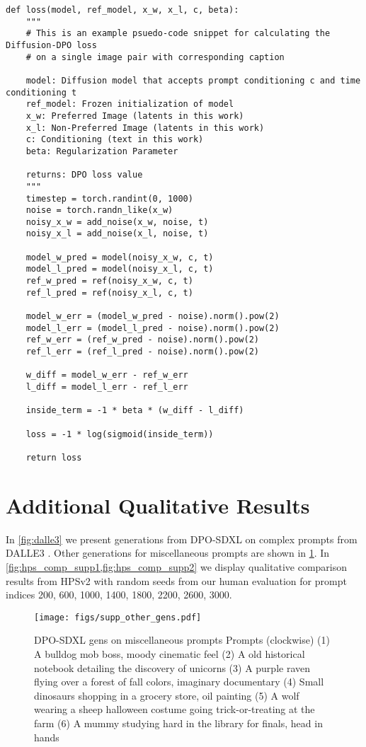 \documentclass[10pt,twocolumn,letterpaper]{article}
\begin{document}
\begin{verbatim}
def loss(model, ref_model, x_w, x_l, c, beta):
    """
    # This is an example psuedo-code snippet for calculating the Diffusion-DPO loss
    # on a single image pair with corresponding caption
    
    model: Diffusion model that accepts prompt conditioning c and time conditioning t
    ref_model: Frozen initialization of model
    x_w: Preferred Image (latents in this work)
    x_l: Non-Preferred Image (latents in this work)
    c: Conditioning (text in this work)
    beta: Regularization Parameter

    returns: DPO loss value
    """
    timestep = torch.randint(0, 1000)
    noise = torch.randn_like(x_w)
    noisy_x_w = add_noise(x_w, noise, t)
    noisy_x_l = add_noise(x_l, noise, t)

    model_w_pred = model(noisy_x_w, c, t)
    model_l_pred = model(noisy_x_l, c, t)
    ref_w_pred = ref(noisy_x_w, c, t)
    ref_l_pred = ref(noisy_x_l, c, t)

    model_w_err = (model_w_pred - noise).norm().pow(2)
    model_l_err = (model_l_pred - noise).norm().pow(2)
    ref_w_err = (ref_w_pred - noise).norm().pow(2)
    ref_l_err = (ref_l_pred - noise).norm().pow(2)

    w_diff = model_w_err - ref_w_err
    l_diff = model_l_err - ref_l_err

    inside_term = -1 * beta * (w_diff - l_diff)

    loss = -1 * log(sigmoid(inside_term))

    return loss
\end{verbatim}



\section{Additional Qualitative Results}

In \cref{fig:dalle3} we present generations from DPO-SDXL on complex prompts from DALLE3 \cite{dalle3}.
Other generations for miscellaneous prompts are shown in \cref{fig:supp_misc_gen}. 
In \cref{fig:hps_comp_supp1,fig:hps_comp_supp2} we display qualitative comparison results from HPSv2 with random seeds from  our human evaluation for prompt indices 200, 600, 1000, 1400, 1800, 2200, 2600, 3000.

\begin{figure}[t]
\centering
   \texttt{[image: figs/supp\_other\_gens.pdf]}
\caption{
   DPO-SDXL gens on miscellaneous prompts
   Prompts (clockwise)
   (1) A bulldog mob boss, moody cinematic feel
   (2) A old historical notebook detailing the discovery of unicorns
   (3) A purple raven flying over a forest of fall colors, imaginary documentary
   (4) Small dinosaurs shopping in a grocery store, oil painting
   (5) A wolf wearing a sheep halloween costume going trick-or-treating at the farm
   (6) A mummy studying hard in the library for finals, head in hands
   }
   \label{fig:supp_misc_gen}
\end{figure}
\end{document}
